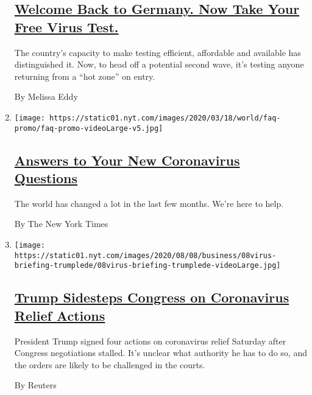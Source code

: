 \begin{enumerate}
  \hypertarget{welcome-back-to-germany-now-take-your-free-virus-test}{%
  \subsection{\texorpdfstring{\href{/2020/08/05/world/europe/germany-coronavirus-test-travelers.html}{Welcome
  Back to Germany. Now Take Your Free Virus
  Test.}}{Welcome Back to Germany. Now Take Your Free Virus Test.}}\label{welcome-back-to-germany-now-take-your-free-virus-test}}

  The country's capacity to make testing efficient, affordable and
  available has distinguished it. Now, to head off a potential second
  wave, it's testing anyone returning from a ``hot zone'' on entry.

  By Melissa Eddy
\item
  \texttt{[image: https://static01.nyt.com/images/2020/03/18/world/faq-promo/faq-promo-videoLarge-v5.jpg]}

  \hypertarget{answers-to-your-new-coronavirus-questions}{%
  \subsection{\texorpdfstring{\href{/interactive/2020/world/coronavirus-tips-advice.html}{Answers
  to Your New Coronavirus
  Questions}}{Answers to Your New Coronavirus Questions}}\label{answers-to-your-new-coronavirus-questions}}

  The world has changed a lot in the last few months. We're here to
  help.

  By The New York Times
\item
  \texttt{[image: https://static01.nyt.com/images/2020/08/08/business/08virus-briefing-trumplede/08virus-briefing-trumplede-videoLarge.jpg]}

  \hypertarget{trump-sidesteps-congress-on-coronavirus-relief-actions}{%
  \subsection{\texorpdfstring{\href{/video/us/politics/100000007279838/trump-coronavirus-relief-order.html}{Trump
  Sidesteps Congress on Coronavirus Relief
  Actions}}{Trump Sidesteps Congress on Coronavirus Relief Actions}}\label{trump-sidesteps-congress-on-coronavirus-relief-actions}}

  President Trump signed four actions on coronavirus relief Saturday
  after Congress negotiations stalled. It's unclear what authority he
  has to do so, and the orders are likely to be challenged in the
  courts.

  By Reuters
\end{enumerate}

